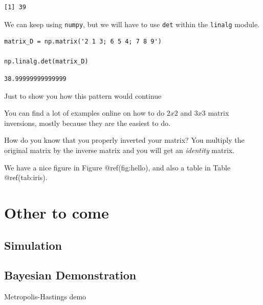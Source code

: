 \documentclass[
  letterpaper,
]{krantz}
\begin{document}
\begin{verbatim}
[1] 39
\end{verbatim}

We can keep using \texttt{numpy}, but we will have to use \texttt{det}
within the \texttt{linalg} module.

\begin{verbatim}
matrix_D = np.matrix('2 1 3; 6 5 4; 7 8 9')

np.linalg.det(matrix_D)
\end{verbatim}

\begin{verbatim}
38.99999999999999
\end{verbatim}

Just to show you how this pattern would continue

You can find a lot of examples online on how to do \(2x2\) and \(3x3\)
matrix inversions, mostly because they are the easiest to do.

How do you know that you properly inverted your matrix? You multiply the
original matrix by the inverse matrix and you will get an
\emph{identity} matrix.

We have a nice figure in Figure @ref(fig:hello), and also a table in
Table @ref(tab:iris).

\chapter{Other to come}\label{other-to-come}

\section{Simulation}\label{simulation}

\section{Bayesian Demonstration}\label{bayesian-demonstration}

Metropolis-Hastings demo
\end{document}
